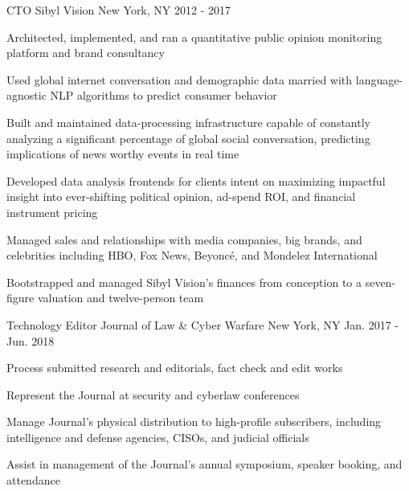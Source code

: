 \begin{cventries}
  \cventry
    {CTO} %
    {Sibyl Vision} %
    {New York, NY} %
    {2012 - 2017} %
    {
      \begin{cvitems} %
      	\item {Architected, implemented, and ran a quantitative public opinion monitoring platform and brand consultancy}
        \item {Used global internet conversation and demographic data married with language-agnostic NLP algorithms to predict consumer behavior}
        \item {Built and maintained data-processing infrastructure capable of constantly analyzing a significant percentage of global social conversation, predicting implications of news worthy events in real time}
        \item {Developed data analysis frontends for clients intent on maximizing impactful insight into ever-shifting political opinion, ad-spend ROI, and financial instrument pricing}
    	\item {Managed sales and relationships with media companies, big brands, and celebrities including HBO, Fox News, Beyoncé, and Mondelez International}
        \item {Bootstrapped and managed Sibyl Vision's finances from conception to a seven-figure valuation and twelve-person team}
      \end{cvitems}
    }

  \cventry
    {Technology Editor} %
    {Journal of Law \& Cyber Warfare} %
    {New York, NY} %
    {Jan. 2017 - Jun. 2018} %
    {
      \begin{cvitems} %
		\item {Process submitted research and editorials, fact check and edit works}
		\item {Represent the Journal at security and cyberlaw conferences}
		\item {Manage Journal's physical distribution to high-profile subscribers, including intelligence and defense agencies, CISOs, and judicial officials}
		\item {Assist in management of the Journal's annual symposium, speaker booking, and attendance}
      \end{cvitems}
    }


\end{cventries}
